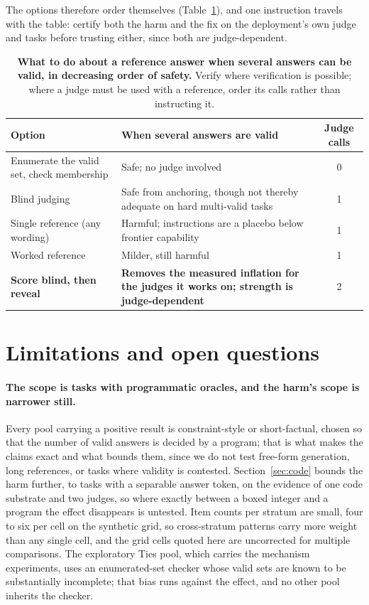 \documentclass[11pt]{article}
\begin{document}
The options therefore order themselves (Table~\ref{tab:decide}), and one instruction travels with the table: certify both the harm and the fix on the deployment's own judge and tasks before trusting either, since both are judge-dependent.

\begin{table}[tbp]
\centering
\small
\setlength{\tabcolsep}{6pt}
\begin{tabular}{p{4.6cm}p{6.2cm}c}
\toprule
Option & When several answers are valid & Judge calls \\
\midrule
Enumerate the valid set, check membership & Safe; no judge involved & 0 \\
Blind judging & Safe from anchoring, though not thereby adequate on hard multi-valid tasks~\cite{calver2026} & 1 \\
Single reference (any wording) & Harmful; instructions are a placebo below frontier capability & 1 \\
Worked reference & Milder, still harmful & 1 \\
\textbf{Score blind, then reveal} & \textbf{Removes the measured inflation for the judges it works on; strength is judge-dependent} & 2 \\
\bottomrule
\end{tabular}
\caption{\textbf{What to do about a reference answer when several answers can be valid, in decreasing order of safety.} Verify where verification is possible; where a judge must be used with a reference, order its calls rather than instructing it.}
\label{tab:decide}
\end{table}

\section{Limitations and open questions}
\label{sec:limits}

\paragraph{The scope is tasks with programmatic oracles, and the harm's scope is narrower still.}
Every pool carrying a positive result is constraint-style or short-factual, chosen so that the number of valid answers is decided by a program; that is what makes the claims exact and what bounds them, since we do not test free-form generation, long references, or tasks where validity is contested.
Section~\ref{sec:code} bounds the harm further, to tasks with a separable answer token, on the evidence of one code substrate and two judges, so where exactly between a boxed integer and a program the effect disappears is untested.
Item counts per stratum are small, four to six per cell on the synthetic grid, so cross-stratum patterns carry more weight than any single cell, and the grid cells quoted here are uncorrected for multiple comparisons.
The exploratory Ties pool, which carries the mechanism experiments, uses an enumerated-set checker whose valid sets are known to be substantially incomplete; that bias runs against the effect, and no other pool inherits the checker.
\end{document}
